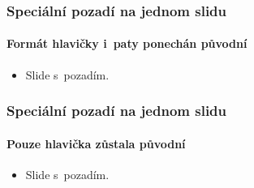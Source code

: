 \documentclass[c, 10pt]{beamer}
\begin{document}
{
\begin{frame}\frametitle{Speciální pozadí na jednom slidu}
\framesubtitle{Formát hlavičky i~paty ponechán původní}

\begin{itemize}\itemsep=1em
\item \textcolor{rred}{Slide s~pozadím.}
\end{itemize}

\end{frame}
}

{
\begin{frame}[plain]\frametitle{Speciální pozadí na jednom slidu}
\framesubtitle{Pouze hlavička zůstala původní}

\begin{itemize}\itemsep=1em
\item \textcolor{rred}{Slide s~pozadím.}
\end{itemize}

\end{frame}
}
\end{document}
